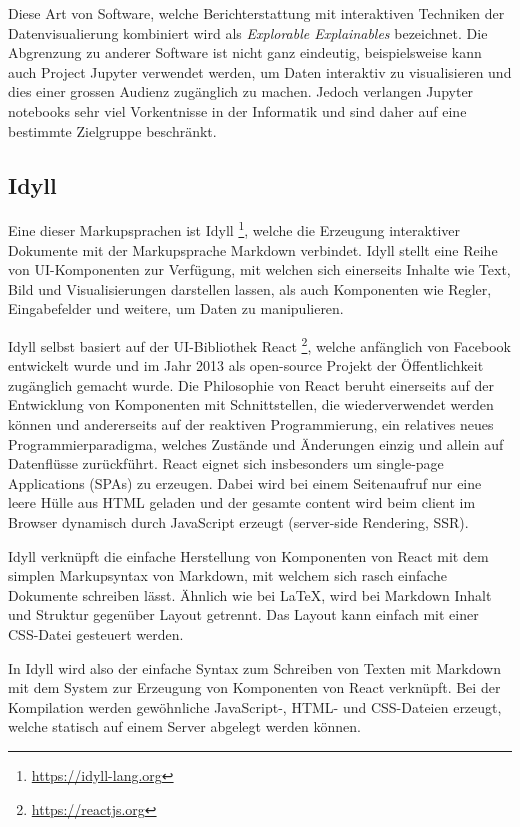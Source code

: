 \documentclass[a4paper,10.2pt,pdftex]{scrartcl}%
\begin{document}
Diese Art von Software, welche Berichterstattung mit interaktiven Techniken der Datenvisualierung kombiniert wird als \emph{Explorable Explainables} bezeichnet. Die Abgrenzung zu anderer Software ist nicht ganz eindeutig, beispielsweise kann auch Project Jupyter verwendet werden, um Daten interaktiv zu visualisieren und dies einer grossen Audienz zugänglich zu machen. Jedoch verlangen Jupyter notebooks sehr viel Vorkentnisse in der Informatik und sind daher auf eine bestimmte Zielgruppe beschränkt. 
\subsection{Idyll}
Eine dieser Markupsprachen ist Idyll \footnote{\url{https://idyll-lang.org}}, welche die Erzeugung interaktiver Dokumente mit der Markupsprache Markdown verbindet. Idyll stellt eine Reihe von UI-Komponenten zur Verfügung, mit welchen sich einerseits Inhalte wie Text, Bild und Visualisierungen darstellen lassen, als auch Komponenten wie Regler, Eingabefelder und weitere, um Daten zu manipulieren.

Idyll selbst basiert auf der UI-Bibliothek React \footnote{\url{https://reactjs.org}}, welche anfänglich von Facebook entwickelt wurde und im Jahr 2013 als open-source Projekt der Öffentlichkeit zugänglich gemacht wurde. Die Philosophie von React beruht einerseits auf der Entwicklung von Komponenten mit Schnittstellen, die wiederverwendet werden können und andererseits auf der reaktiven Programmierung, ein relatives neues Programmierparadigma, welches Zustände und Änderungen einzig und allein auf Datenflüsse zurückführt. React eignet sich insbesonders um single-page Applications (SPAs) zu erzeugen. Dabei wird bei einem Seitenaufruf nur eine leere Hülle aus HTML geladen und der gesamte content wird beim client im Browser dynamisch durch JavaScript erzeugt (server-side Rendering, SSR).

Idyll verknüpft die einfache Herstellung von Komponenten von React mit dem simplen Markupsyntax von Markdown, mit welchem sich rasch einfache Dokumente schreiben lässt. Ähnlich wie bei LaTeX, wird bei Markdown Inhalt und Struktur gegenüber Layout getrennt. Das Layout kann einfach mit einer CSS-Datei gesteuert werden.

In Idyll wird also der einfache Syntax zum Schreiben von Texten mit Markdown mit dem System zur Erzeugung von Komponenten von React verknüpft. Bei der Kompilation werden gewöhnliche JavaScript-, HTML- und CSS-Dateien erzeugt, welche statisch auf einem Server abgelegt werden können.
\end{document}
